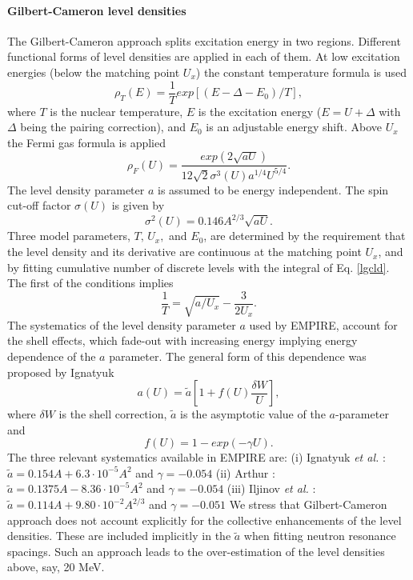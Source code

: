 \documentclass[twocolumn,amsmath,amssymb,10pt,groupedaddress,a4paper]{revtex4}
\begin{document}
\paragraph{Gilbert-Cameron level densities}
The Gilbert-Cameron approach \cite{gc} splits excitation energy in
two regions. Different functional forms of level densities
are applied in each of them. At low excitation energies (below the
matching point $U_{x}$) the constant temperature formula is used
\begin{equation}
\rho_{T}(E)=\frac{1}{T}exp\left[(E-\Delta-E_{0})/T\right],
\label{lgcld}
\end{equation}
\noindent where $T$ is the nuclear temperature, $E$ is the excitation energy
($E=U+\Delta$ with $\Delta$ being the pairing correction), and $E_{0}$
is an adjustable energy shift. Above $U_{x}$ the Fermi gas formula
is applied
\begin{equation}
\rho_{F}(U)=\frac{exp(2\sqrt{aU})}{12\sqrt{2}\sigma^3(U)a^{1/4}U^{5/4}}.
\label{ferld}
\end{equation}
The level density parameter $a$ is assumed to be energy independent.
The spin cut-off factor $\sigma(U)$ is given by
\begin{equation}
\sigma^{2}(U)=0.146A^{2/3}\sqrt{aU}.
\label{sigld}
\end{equation}
Three model parameters, $T,\, U_{x},$ and $E_{0}$, are determined
by the requirement that the level density and its derivative are continuous
at the matching point $U_{x}$, and by fitting cumulative number of
discrete levels with the integral of Eq. \ref{lgcld}. The first of
the conditions implies
\begin{equation}
\frac{1}{T}=\sqrt{a/U_{x}}-\frac{3}{2U_{x}}.
\label{condUT}
\end{equation}
The systematics of the level density parameter $a$ used by EMPIRE,
account for the shell effects, which fade-out
with increasing energy implying energy dependence of the $a$ parameter.
The general form of this dependence was proposed by Ignatyuk~\cite{ignaa}
\begin{equation}
a(U)=\widetilde{a}[1+f(U)\frac{\delta W}{U}],
\label{apiccoloGC}
\end{equation}
\noindent where $\delta W$ is the shell correction, $\widetilde{a}$ is the
asymptotic value of the $a$-parameter and
\begin{equation}
f(U)=1-exp(-\gamma U).
\label{shellGC}
\end{equation}
The three relevant systematics available in EMPIRE are:
(i) Ignatyuk \emph{et al.} \cite{ignaa}: $\widetilde{a}=0.154A+6.3\cdot10^{-5}A^{2}$
and $\gamma=-0.054$
(ii) Arthur \cite{arthura}: $\widetilde{a}=0.1375A-8.36\cdot10^{-5}A^{2}$
and $\gamma=-0.054$
(iii) Iljinov \emph{et al.} \cite{Mebel}: $\widetilde{a}=0.114A+9.80\cdot10^{-2}A^{2/3}$
and $\gamma=-0.051$
We stress that Gilbert-Cameron approach does not account explicitly
for the collective enhancements of the level densities.
These are included implicitly in the $\widetilde{a}$ when fitting
neutron resonance spacings. Such an approach leads to the over-estimation
of the level densities above, say, 20 MeV.
\end{document}
